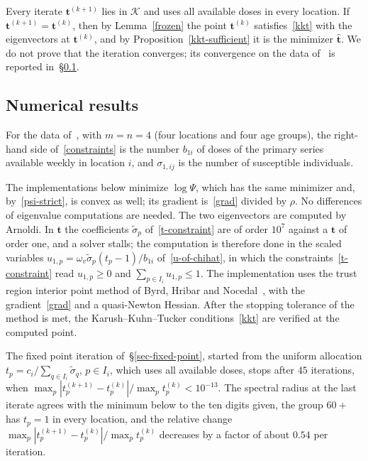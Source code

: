 \documentclass[11pt]{article}
\theoremstyle{plain}
\theoremstyle{definition}
\theoremstyle{remark}
\numberwithin{equation}{section}
\numberwithin{figure}{section}
\numberwithin{table}{section}
\numberwithin{algorithm}{section}
\begin{document}
Every iterate $\bm t^{(k+1)}$ lies in $\mathcal{K}$ and uses all available
doses in every location. If $\bm t^{(k+1)}=\bm t^{(k)}$, then by Lemma~\ref{frozen} the
point $\bm t^{(k)}$ satisfies~\eqref{kkt} with the eigenvectors at
$\bm t^{(k)}$, and by Proposition~\ref{kkt-sufficient} it is the minimizer
$\widehat{\bm t}$. We do not prove that the iteration converges; its
convergence on the data of~\cite{JZh} is reported in~\S\ref{sec-numerics}.

\subsection{Numerical results}\label{sec-numerics}

For the data of~\cite{JZh}, with $m=n=4$ (four locations and four age groups),
the right-hand side of~\eqref{constraints} is the number $b_{1i}$ of
doses of the primary series available weekly in location $i$, and $\sigma_{1,ij}$ is the number
of susceptible individuals.

The implementations below minimize $\log\Psi$, which has the same minimizer
and, by~\eqref{psi-strict}, is convex as well; its gradient is~\eqref{grad}
divided by $\rho$.
No differences of eigenvalue computations are needed. The two eigenvectors are
computed by Arnoldi. In $\bm t$ the coefficients $\widetilde\sigma_p$
of~\eqref{t-constraint} are of order $10^{7}$ against a $\bm t$ of order one,
and a solver stalls; the computation is therefore done in the scaled variables
$u_{1,p}=\omega_v\widetilde\sigma_p\left(t_p-1\right)/b_{1i}$ of~\eqref{u-of-chihat},
in which the constraints~\eqref{t-constraint} read $u_{1,p}\ge 0$ and
$\sum_{p\in I_i}u_{1,p}\le 1$. The implementation uses the trust region interior point method
of Byrd, Hribar and Nocedal~\cite{1999Byrd_Hribar_Nocedal}, with the
gradient~\eqref{grad} and a quasi-Newton Hessian.
After the stopping tolerance of the method is met, the Karush--Kuhn--Tucker
conditions~\eqref{kkt} are verified at the computed point.

The fixed point iteration of~\S\ref{sec-fixed-point}, started from the
uniform allocation $t_p=c_i/\sum_{q\in I_i}\widetilde\sigma_q$, $p\in I_i$, which
uses all available doses, stops after $45$ iterations, when
$\max_p\left|t_p^{(k+1)}-t_p^{(k)}\right|/\max_pt_p^{(k)}<10^{-13}$. The
spectral radius at the last iterate agrees with the minimum below to the ten
digits given, the group $60+$ has $t_p=1$ in every location, and the
relative change $\max_p\left|t_p^{(k+1)}-t_p^{(k)}\right|/\max_pt_p^{(k)}$
decreases by a factor of about $0.54$ per iteration.
\end{document}
